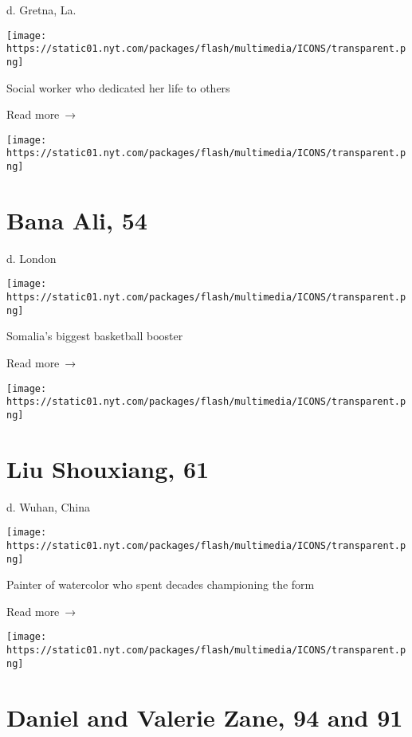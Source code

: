 d. Gretna, La.

\texttt{[image: https://static01.nyt.com/packages/flash/multimedia/ICONS/transparent.png]}

Social worker who dedicated her life to others

 Read more~→

\href{https://www.nytimes.com/2020/05/05/obituaries/bana-ali-dead-coronavirus.html}{}

\texttt{[image: https://static01.nyt.com/packages/flash/multimedia/ICONS/transparent.png]}

\hypertarget{bana-ali-54}{%
\section{Bana Ali, 54}\label{bana-ali-54}}

d. London

\texttt{[image: https://static01.nyt.com/packages/flash/multimedia/ICONS/transparent.png]}

Somalia's biggest basketball booster

 Read more~→

\href{https://www.nytimes.com/2020/05/04/obituaries/liu-shouxiang-coronavirus-dead.html}{}

\texttt{[image: https://static01.nyt.com/packages/flash/multimedia/ICONS/transparent.png]}

\hypertarget{liu-shouxiang-61}{%
\section{Liu Shouxiang, 61}\label{liu-shouxiang-61}}

d. Wuhan, China

\texttt{[image: https://static01.nyt.com/packages/flash/multimedia/ICONS/transparent.png]}

Painter of watercolor who spent decades championing the form

 Read more~→

\href{https://www.nytimes.com/2020/05/04/obituaries/daniel-and-valerie-zane-dead-coronavirus.html}{}

\texttt{[image: https://static01.nyt.com/packages/flash/multimedia/ICONS/transparent.png]}

\hypertarget{daniel-and-valerie-zane-94-and-91}{%
\section{Daniel and Valerie Zane, 94 and
91}\label{daniel-and-valerie-zane-94-and-91}}

